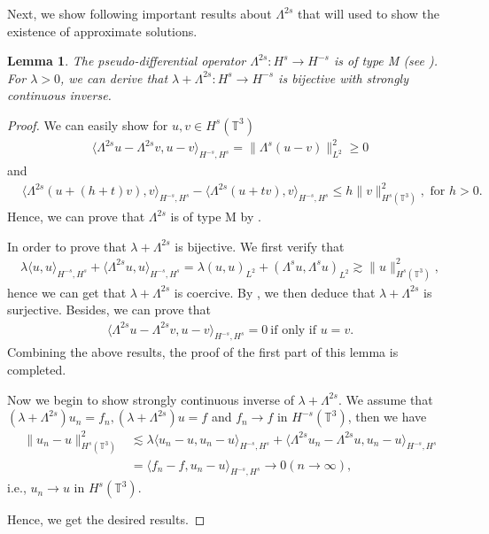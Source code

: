\documentclass[reqno,a4paper,11pt]{amsart}
\theoremstyle{plain}
\newtheorem{lemma}[theorem]{Lemma}
\numberwithin{equation}{section}
\begin{document}
Next, we show following important results about $\Lambda^{2s}$ that will used to show the existence of approximate solutions.
\begin{lemma}\label{lem5}
	The pseudo-differential operator $\Lambda^{2s}:H^{s}\rightarrow H^{-s}$ is of type M (see \cite{SRE}). For $\lambda>0$, we can derive that $\lambda+\Lambda^{2s}:H^{s}\rightarrow H^{-s}$ is bijective with strongly continuous inverse.
\end{lemma}
\begin{proof}
	We can easily show  for $u,v \in H^{s}(\mathbb{T}^{3})$
	\begin{align*}
		\langle \Lambda^{2s}u-\Lambda^{2s}v,u-v \rangle_{H^{-s},H^{s}}=\|\Lambda^{s}(u-v)\|_{L^{2}}^2\geq0
	\end{align*}
	and
	\begin{align*}
		&\langle \Lambda^{2s}(u+(h+t)v),v \rangle_{H^{-s},H^{s}}-\langle \Lambda^{2s}(u+tv),v \rangle_{H^{-s},H^{s}}
		\leq h\| v\|_{H^{s}(\mathbb{T}^{3})}^{2}  , \text{ for } h>0.
	\end{align*}
	Hence, we can prove that  $\Lambda^{2s}$ is of type M by  \cite[Lemma 2.1 in Chapter II]{SRE}.
	
	
	
	In order to prove that $\lambda+\Lambda^{2s}$ is bijective. We first verify that
	\begin{align*}
		\lambda\langle u,u\rangle_{H^{-s},H^{s}}+\langle \Lambda^{2s}u,u \rangle_{H^{-s},H^{s}}=\lambda(u,u)_{L^{2}}+(\Lambda^{s}u,\Lambda^{s}u)_{L^{2}}\gtrsim \| u\|_{H^{s}(\mathbb{T}^{3})}^{2},
	\end{align*}
	hence we can get that $\lambda+\Lambda^{2s}$ is coercive. By \cite[Lemma 2.1 and Corollary 2.2 in Chapter II]{SRE}, we then deduce that $\lambda+\Lambda^{2s}$ is surjective. Besides, we can prove that
	\begin{align*}
		\langle \Lambda^{2s}u-\Lambda^{2s}v,u-v \rangle_{H^{-s},H^{s}}=0 \ \text{if only if $u=v$.}
	\end{align*}
	Combining the above results, the proof of the first part of this lemma is completed.
	
	
	Now we begin to show strongly continuous inverse of $\lambda+\Lambda^{2s}$. We assume that
	$(\lambda+\Lambda^{2s})u_{n}=f_{n},(\lambda+\Lambda^{2s})u=f$ and $f_{n}\rightarrow f$ in $H^{-s}(\mathbb{T}^{3})$, then we have
	\begin{align*}
		\| u_{n}-u\|_{H^{s}(\mathbb{T}^{3})}^{2}&\lesssim\lambda\langle u_{n}-u,u_{n}-u\rangle_{H^{-s},H^{s}}+\langle \Lambda^{2s}u_{n}-\Lambda^{2s}u,u_{n}-u \rangle_{H^{-s},H^{s}}
		\\&=\langle f_{n}-f,u_{n}-u \rangle_{H^{-s},H^{s}}\rightarrow0(n\rightarrow\infty),
	\end{align*}
	i.e., $u_{n}\rightarrow u$ in $H^{s}(\mathbb{T}^{3})$.
	
	
	Hence, we get the desired results.
\end{proof}
\end{document}
